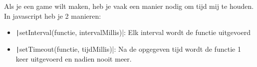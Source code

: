 Als je een game wilt maken, heb je vaak een manier nodig om tijd mij te houden.
In javascript heb je 2 manieren:
\begin{itemize}
    \item \texttt|setInterval(functie, intervalMillis)|: Elk
        interval wordt de functie uitgevoerd
    \item \texttt|setTimeout(functie, tijdMillis)|: Na de
        opgegeven tijd wordt de functie 1 keer uitgevoerd en nadien nooit meer.
\end{itemize}

